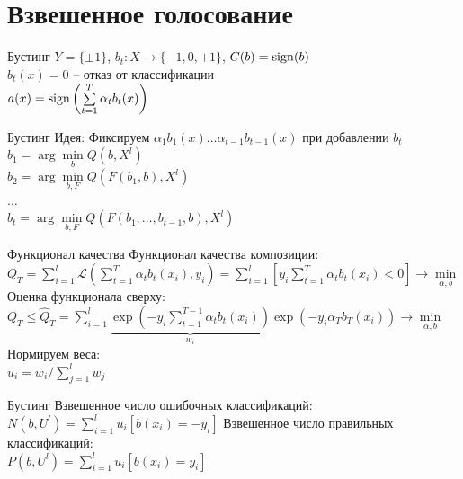 \documentclass[10pt]{beamer}
\begin{document}
\section{Взвешенное голосование}

{
\begin{frame}{Бустинг}
  $Y = \{\pm 1\}$, \qquad $b_t: X\rightarrow \{-1, 0, +1\}$, \qquad $C(b) = \operatorname{sign}(b)$\\
  $b_t(x) = 0$ -- отказ от классификации\\
  \bigbreak
  \pause
  $a(x) = \operatorname{sign}\left(\sum\limits_{t=1}^{T} \alpha_t b_t(x)\right)$\\
  \bigbreak
\end{frame}
}

{
\begin{frame}{Бустинг}
  \alert{Идея}: Фиксируем $\alpha_1 b_1(x) \dots \alpha_{t-1} b_{t-1}(x)$ при добавлении $b_t$
  \bigbreak
  \pause
  $b_1 = \arg\min\limits_{b} Q(b, X^l)$\\
  $b_2 = \arg\min\limits_{b, F} Q(F(b_1, b), X^l)$\\
  $\dots$\\
  $b_t = \arg\min\limits_{b, F} Q(F(b_1, \dots, b_{t-1}, b), X^l)$
\end{frame}
}

\begin{frame}{Функционал качества}  
  Функционал качества композиции:\\
  $Q_T = \sum\limits_{i=1}^l \mathcal{L}(\sum\limits_{t=1}^{T} \alpha_t b_t(x_i), y_i)  = 
  \sum\limits_{i=1}^l \left[ y_i \sum\limits_{t=1}^{T} \alpha_t b_t(x_i) < 0 \right] \rightarrow \min\limits_{\alpha, b}$
  \bigbreak
  \pause
  Оценка функционала сверху:\\
  $Q_T \leq \hat{Q}_T = \sum\limits_{i=1}^l \underbrace{ \exp \left( -y_i \sum\limits_{t=1}^{T-1} \alpha_t b_t(x_i) \right) }_{w_i} \exp(-y_i \alpha_T b_T(x_i))\rightarrow \min\limits_{\alpha, b}$\\
  Нормируем веса:\\
  $u_i = w_i / \sum\limits_{j=1}^l w_j$
\end{frame}

\begin{frame}{Бустинг}  
  Взвешенное число ошибочных классификаций:\\
  $N(b, U^l) = \sum\limits_{i=1}^l u_i [b(x_i) = -y_i]$
  \bigbreak
  Взвешенное число правильных классификаций:\\
  $P(b, U^l) = \sum\limits_{i=1}^l u_i [b(x_i) = y_i]$
\end{frame}
\end{document}

